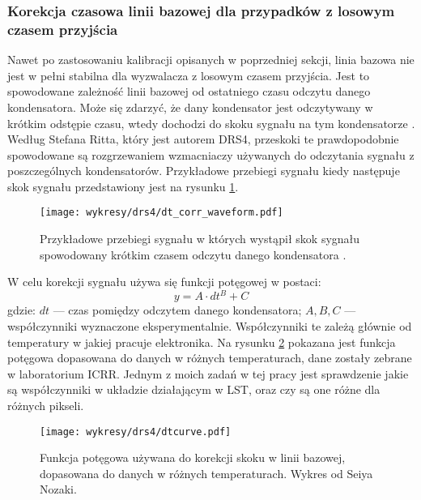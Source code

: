 \documentclass[a4paper,11pt,twoside]{article}
\begin{document}
\subsubsection{Korekcja czasowa linii bazowej dla przypadków z losowym czasem przyjścia}
Nawet po zastosowaniu kalibracji opisanych w poprzedniej sekcji, linia bazowa nie jest w pełni stabilna dla wyzwalacza z losowym czasem przyjścia. Jest to spowodowane zależność linii bazowej od ostatniego czasu odczytu danego kondensatora. Może się zdarzyć, że dany kondensator jest odczytywany w krótkim odstępie czasu, wtedy dochodzi do skoku sygnału na tym kondensatorze \cite{drs4_magic}. Według Stefana Ritta, który jest autorem DRS4, przeskoki te prawdopodobnie spowodowane są rozgrzewaniem wzmacniaczy używanych do odczytania sygnału z poszczególnych kondensatorów. Przykładowe przebiegi sygnału kiedy następuje skok sygnału przedstawiony jest na rysunku \ref{fig:dt_corr}. 
\begin{figure}[H] 
\centering
\texttt{[image: wykresy/drs4/dt\_corr\_waveform.pdf]}
\caption{Przykładowe przebiegi sygnału w których wystąpił skok sygnału spowodowany krótkim czasem odczytu danego kondensatora \cite{drs4_magic}.}
\label{fig:dt_corr}
\end{figure}
W celu korekcji sygnału używa się funkcji potęgowej w postaci:
\begin{equation}
\label{eqn:power_law}
y = A \cdot dt^B + C
\end{equation}
gdzie: $dt$ --- czas pomiędzy odczytem danego kondensatora; $A, B, C$ --- współczynniki wyznaczone eksperymentalnie. 
Współczynniki te zależą głównie od temperatury w jakiej pracuje elektronika. Na rysunku \ref{fig:dt_corr_fit} pokazana jest funkcja potęgowa dopasowana do danych w różnych temperaturach, dane zostały zebrane w laboratorium ICRR. Jednym z moich zadań w tej pracy jest sprawdzenie jakie są współczynniki w układzie działającym w LST, oraz czy są one różne dla różnych pikseli. 
\begin{figure}[H] 
\centering
\texttt{[image: wykresy/drs4/dtcurve.pdf]}
\caption{Funkcja potęgowa używana do korekcji skoku w linii bazowej, dopasowana do danych w różnych temperaturach. Wykres od Seiya Nozaki.}
\label{fig:dt_corr_fit}
\end{figure}
\newpage
\end{document}
